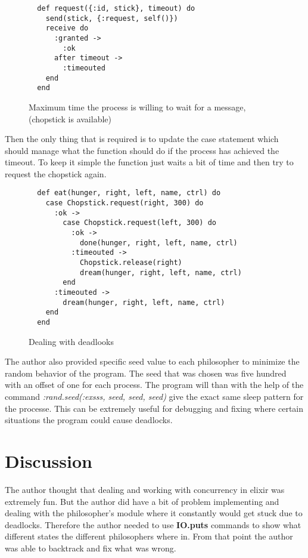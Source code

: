 \documentclass[a4paper,11pt]{article}
\begin{document}
\begin{figure}[H]
\begin{verbatim}
  def request({:id, stick}, timeout) do
    send(stick, {:request, self()})
    receive do
      :granted ->
        :ok
      after timeout ->
        :timeouted
    end
  end
\end{verbatim}
\caption{Maximum time the process is willing to wait for a message, (chopstick is available)}
\label{Figure:7}
\end{figure}

Then the only thing that is required is to update the case statement which should manage what the function should do if the process has achieved the timeout. To keep it simple the function just waits a bit of time and then try to request the chopstick again.

\begin{figure}[H]
\begin{verbatim}
  def eat(hunger, right, left, name, ctrl) do
    case Chopstick.request(right, 300) do
      :ok ->
        case Chopstick.request(left, 300) do
          :ok ->
            done(hunger, right, left, name, ctrl)
          :timeouted ->
            Chopstick.release(right)
            dream(hunger, right, left, name, ctrl)
        end
      :timeouted ->
        dream(hunger, right, left, name, ctrl)
    end
  end
\end{verbatim}
\caption{Dealing with deadlooks}
\label{Figure:8}
\end{figure}

The author also provided specific seed value to each philosopher to minimize the random behavior of the program. The seed that was chosen was five hundred with an offset of one for each process. The program will than with the help of the command \textit{:rand.seed(:exsss, {seed, seed, seed})} give the exact same sleep pattern for the processe. This can be extremely useful for debugging and fixing where certain situations the program could cause deadlocks.

\section*{Discussion}
The author thought that dealing and working with concurrency in elixir was extremely fun. But the author did have a bit of problem implementing and dealing with the philosopher’s module where it constantly would get stuck due to deadlocks. Therefore the author needed to use \textbf{IO.puts} commands to show what different states the different philosophers where in. From that point the author was able to backtrack and fix what was wrong.
\end{document}
